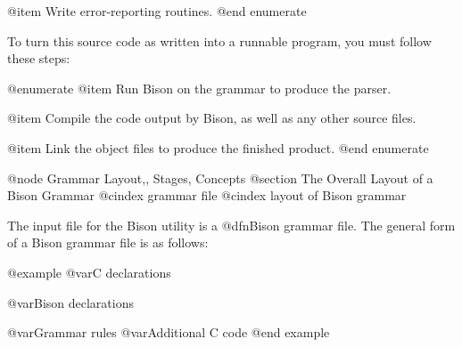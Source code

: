 @item
Write error-reporting routines.
@end enumerate

To turn this source code as written into a runnable program, you
must follow these steps:

@enumerate
@item
Run Bison on the grammar to produce the parser.

@item
Compile the code output by Bison, as well as any other source files.

@item
Link the object files to produce the finished product.
@end enumerate

@node Grammar Layout,, Stages, Concepts
@section The Overall Layout of a Bison Grammar
@cindex grammar file
@cindex layout of Bison grammar

The input file for the Bison utility is a @dfn{Bison grammar file}.  The
general form of a Bison grammar file is as follows:

@example
@var{C declarations}

@var{Bison declarations}

@var{Grammar rules}
@var{Additional C code}
@end example

